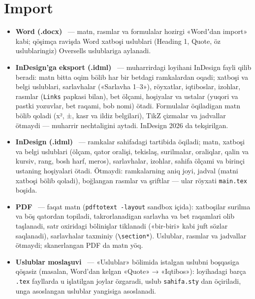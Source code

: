\section{Import}\label{sec:sd-import}
\begin{itemize}
\item \textbf{Word (.docx)} \beta\ --- matn, rasmlar va formulalar hozirgi «Wordʼdan import» kabi; qöşimça ravişda Word xatboşi uslublari (Heading 1, Quote, öz uslublaringiz) Oversells uslublariga aylanadi.
\item \textbf{InDesign'ga eksport (.idml)} \beta\ --- muharrirdagi  loyihani InDesign fayli qilib beradi: matn bitta oqim bölib har bir betdagi ramkalardan oqadi; xatboşi va belgi uslublari, sarlavhalar («Sarlavha 1--3»), röyxatlar, iqtiboslar, izohlar, rasmlar (\texttt{Links} papkasi bilan), bet ölçami, hoşiyalar va ustalar (yuqori va pastki yozuvlar, bet raqami, bob nomi) ötadi. Formulalar öqiladigan matn bölib qoladi (x², ±, kasr va ildiz belgilari), TikZ çizmalar va jadvallar ötmaydi --- muharrir nechtaligini aytadi. InDesign 2026 da tekşirilgan.
\item \textbf{InDesign (.idml)} \beta\ --- ramkalar sahifadagi tartibida öqiladi; matn, xatboşi va belgi uslublari (ölçam, qator oralişi, tekislaş, surilmalar, oraliqlar, qalin va kursiv, rang, bosh harf, meros), sarlavhalar, izohlar, sahifa ölçami va birinçi ustaning hoşiyalari ötadi. Ötmaydi: ramkalarning aniq joyi, jadval (matni xatboşi bölib qoladi), boğlangan rasmlar va şriftlar --- ular röyxati \texttt{main.tex} boşida.
\item \textbf{PDF} \beta\ --- faqat matn (\texttt{pdftotext -layout} sandbox içida): xatboşilar surilma va böş qatordan topiladi, takrorlanadigan sarlavha va bet raqamlari olib taşlanadi, satr oxiridagi bölinişlar tiklanadi («bir-biri» kabi juft sözlar saqlanadi), sarlavhalar taxminiy (\texttt{\textbackslash section*}). Uslublar, rasmlar va jadvallar ötmaydi; skanerlangan PDF da matn yöq.
\item \textbf{Uslublar moslaşuvi} \beta\ --- «Uslublar» bölimida istalgan uslubni boşqasiga qöşasiz (masalan, Word'dan kelgan «Quote» → «Iqtibos»): loyihadagi barça \texttt{.tex} fayllarda u işlatilgan joylar özgaradi, uslub \texttt{sahifa.sty} dan öçiriladi, unga asoslangan uslublar yangisiga asoslanadi.
\end{itemize}

